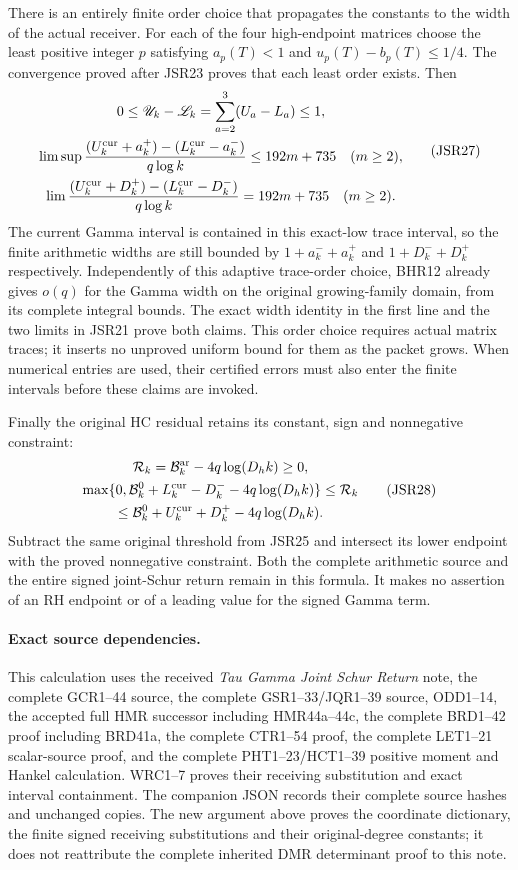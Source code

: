 \documentclass[11pt,a4paper]{article}
\begin{document}
There is an entirely finite order choice that propagates
the constants to the width of the actual receiver.
For each of the four high-endpoint matrices choose the least positive
integer $p$ satisfying $a_p(T)<1$ and
$u_p(T)-b_p(T)\leq1/4$. The convergence proved after
JSR23 proves that each least order exists. Then
\[
\begin{gathered}
 0\leq\mathscr U_k-\mathscr L_k
   =\sum_{a=2}^3(U_a-L_a)\leq1,\\
 \limsup\frac{
   (U_k^{\rm cur}+a_k^+)-(L_k^{\rm cur}-a_k^-)}{q\log k}
   \leq192m+735\quad(m\geq2),\\
 \lim\frac{
   (U_k^{\rm cur}+D_k^+)-(L_k^{\rm cur}-D_k^-)}{q\log k}
   =192m+735\quad(m\geq2).
\end{gathered}\tag{JSR27}
\]
The current Gamma interval is contained in this exact-low
trace interval, so the finite arithmetic widths are still
bounded by $1+a_k^-+a_k^+$ and $1+D_k^-+D_k^+$ respectively.
Independently of this adaptive trace-order choice, BHR12
already gives $o(q)$ for the Gamma width on the original
growing-family domain, from its complete integral bounds.
The exact width identity in the first line and the
two limits in JSR21 prove both claims. This order choice
requires actual matrix traces; it inserts no unproved
uniform bound for them as the packet grows. When numerical
entries are used, their certified errors must also enter
the finite intervals before these claims are invoked.

Finally the original HC residual retains its constant,
sign and nonnegative constraint:
\[
\begin{gathered}
 \mathcal R_k=\mathcal B_k^{\rm ar}-4q\log(D_hk)\geq0,\\
 \max\{0,\mathcal B_k^0+L_k^{\rm cur}-D_k^-
                         -4q\log(D_hk)\}
 \leq\mathcal R_k\\
 \leq\mathcal B_k^0+U_k^{\rm cur}+D_k^+
                         -4q\log(D_hk).
\end{gathered}\tag{JSR28}
\]
Subtract the same original threshold from JSR25 and
intersect its lower endpoint with the proved nonnegative
constraint. Both the complete arithmetic source and the
entire signed joint-Schur return remain in this formula.
It makes no assertion of an RH endpoint or of a leading
value for the signed Gamma term.

\paragraph{Exact source dependencies.}
This calculation uses the received \emph{Tau Gamma Joint
Schur Return} note, the complete GCR1--44 source, the complete
GSR1--33/JQR1--39 source, ODD1--14, the accepted full
HMR successor including HMR44a--44c, the complete BRD1--42
proof including BRD41a, the complete CTR1--54 proof,
the complete LET1--21 scalar-source proof, and the complete
PHT1--23/HCT1--39 positive moment and Hankel calculation.
WRC1--7 proves their receiving substitution and exact interval
containment. The companion JSON
records their complete source hashes and unchanged copies.
The new argument above proves the coordinate dictionary,
the finite signed receiving substitutions and their
original-degree constants; it does not reattribute the
complete inherited DMR determinant proof to this note.
\end{document}
